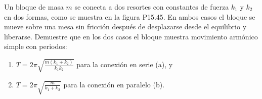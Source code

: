 \item Un bloque de masa $m$ se conecta a dos resortes con constantes de fuerza $k_1$ y $k_2$ en dos formas, como se muestra en la figura P15.45. En ambos casos el bloque se mueve sobre una mesa sin fricción después de desplazarse desde el equilibrio y liberarse. Demuestre que en los dos casos el bloque muestra movimiento armónico simple con periodos:
\begin{enumerate}
    \item $T = 2\pi \sqrt{\frac{m(k_1 + k_2)}{k_1 k_2}}$ para la conexión en serie (a), y
    \item $T = 2\pi \sqrt{\frac{m}{k_1 + k_2}}$ para la conexión en paralelo (b).
\end{enumerate}